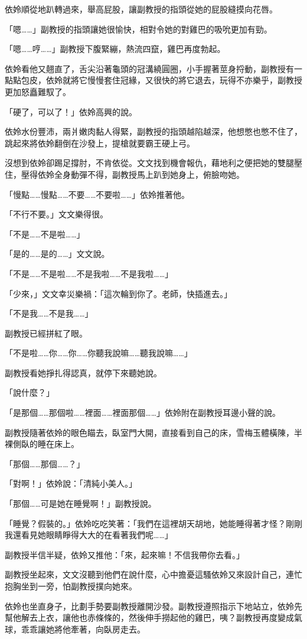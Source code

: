 依姈順從地趴轉過來，舉高屁股，讓副教授的指頭從她的屁股縫摸向花唇。

「嗯……」副教授的指頭讓她很愉快，相對令她的對雞巴的吸吮更加有勁。

「嗯……哼……」副教授下腹緊繃，熱流四竄，雞巴再度勃起。

依姈看他又翹直了，舌尖沿著龜頭的冠溝繞圓圈，小手握著莖身捋動，副教授有一點點包皮，依姈就將它慢慢套住冠緣，又很快的將它退去，玩得不亦樂乎，副教授更加怒矗難馭了。

「硬了，可以了！」依姈高興的說。

依姈水份豐沛，兩爿嫩肉黏人得緊，副教授的指頭越陷越深，他想憋也憋不住了，跳起來將依姈翻倒在沙發上，提槍就要霸王硬上弓。

沒想到依姈卻踢足撐肘，不肯依從。文文找到機會報仇，藉地利之便把她的雙腿壓住，壓得依姈全身動彈不得，副教授馬上趴到她身上，俯臉吻她。

「慢點……慢點……不要……不要啦……」依姈推著他。

「不行不要。」文文樂得很。

「不是……不是啦……」

「是的……是的……」文文說。

「不是……不是啦……不是我啦……不是我啦……」

「少來，」文文幸災樂禍：「這次輪到你了。老師，快插進去。」

「不是我……不是我……」

副教授已經拼紅了眼。

「不是啦……你……你……你聽我說嘛……聽我說嘛……」

副教授看她掙扎得認真，就停下來聽她說。

「說什麼？」

「是那個……那個啦……裡面……裡面那個……」依姈附在副教授耳邊小聲的說。

副教授隨著依姈的眼色瞄去，臥室門大開，直接看到自己的床，雪梅玉體橫陳，半裸側臥的睡在床上。

「那個……那個……？」

「對啊！」依姈說：「清純小美人。」

「那個……可是她在睡覺啊！」副教授說。

「睡覺？假裝的。」依姈吃吃笑著：「我們在這裡胡天胡地，她能睡得著才怪？剛剛我還看見她眼睛睜得大大的在看著我們呢……」

副教授半信半疑，依姈又推他：「來，起來嘛！不信我帶你去看。」

副教授坐起來，文文沒聽到他們在說什麼，心中擔憂這騷依姈又來設計自己，連忙抱胸坐到一旁，怕副教授撲向她來。

依姈也坐直身子，比劃手勢要副教授離開沙發。副教授遵照指示下地站立，依姈先幫他解去上衣，讓他也赤條條的，然後伸手撈起他的雞巴，咦？副教授再度變成氣球，乖乖讓她將他牽著，向臥房走去。

